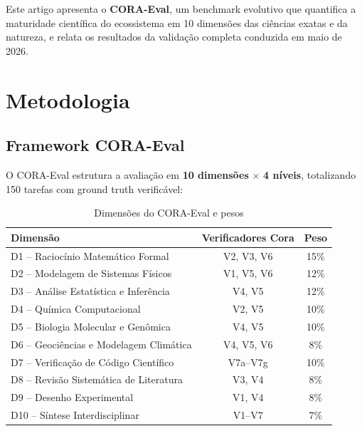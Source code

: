 \documentclass[12pt,a4paper]{article}
\begin{document}
Este artigo apresenta o \textbf{CORA-Eval}, um benchmark evolutivo que quantifica
a maturidade científica do ecossistema em 10 dimensões das ciências exatas e
da natureza, e relata os resultados da validação completa conduzida em maio de 2026.

\section{Metodologia}

\subsection{Framework CORA-Eval}

O CORA-Eval estrutura a avaliação em \textbf{10 dimensões} $\times$ \textbf{4 níveis},
totalizando 150 tarefas com ground truth verificável:

\begin{table}[H]
\centering
\caption{Dimensões do CORA-Eval e pesos}
\label{tab:dimensions}
\begin{tabular}{lcc}
\toprule
\textbf{Dimensão} & \textbf{Verificadores Cora} & \textbf{Peso} \\
\midrule
D1 -- Raciocínio Matemático Formal      & V2, V3, V6      & 15\% \\
D2 -- Modelagem de Sistemas Físicos     & V1, V5, V6      & 12\% \\
D3 -- Análise Estatística e Inferência  & V4, V5          & 12\% \\
D4 -- Química Computacional             & V2, V5          & 10\% \\
D5 -- Biologia Molecular e Genômica     & V4, V5          & 10\% \\
D6 -- Geociências e Modelagem Climática & V4, V5, V6      &  8\% \\
D7 -- Verificação de Código Científico  & V7a--V7g        & 10\% \\
D8 -- Revisão Sistemática de Literatura & V3, V4          &  8\% \\
D9 -- Desenho Experimental              & V1, V4          &  8\% \\
D10 -- Síntese Interdisciplinar         & V1--V7          &  7\% \\
\bottomrule
\end{tabular}
\end{table}
\end{document}
